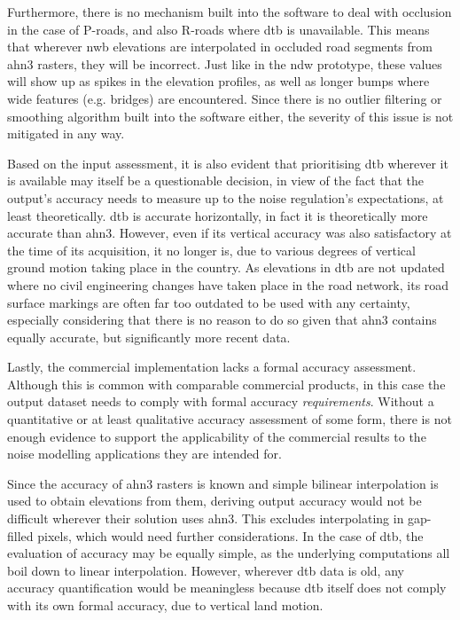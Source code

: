 Furthermore, there is no mechanism built into the software to deal with occlusion in the case of P-roads, and also R-roads where \ac{dtb} is unavailable. This means that wherever \ac{nwb} elevations are interpolated in occluded road segments from \ac{ahn3} rasters, they will be incorrect. Just like in the \ac{ndw} prototype, these values will show up as spikes in the elevation profiles, as well as longer bumps where wide features (e.g. bridges) are encountered. Since there is no outlier filtering or smoothing algorithm built into the software either, the severity of this issue is not mitigated in any way.

Based on the input assessment, it is also evident that prioritising \ac{dtb} wherever it is available may itself be a questionable decision, in view of the fact that the output's accuracy needs to measure up to the noise regulation's expectations, at least theoretically. \ac{dtb} is accurate horizontally, in fact it is theoretically more accurate than \ac{ahn3}. However, even if its vertical accuracy was also satisfactory at the time of its acquisition, it no longer is, due to various degrees of vertical ground motion taking place in the country. As elevations in \ac{dtb} are not updated where no civil engineering changes have taken place in the road network, its road surface markings are often far too outdated to be used with any certainty, especially considering that there is no reason to do so given that \ac{ahn3} contains equally accurate, but significantly more recent data.

Lastly, the commercial implementation lacks a formal accuracy assessment. Although this is common with comparable commercial products, in this case the output dataset needs to comply with formal accuracy \textit{requirements}. Without a quantitative or at least qualitative accuracy assessment of some form, there is not enough evidence to support the applicability of the commercial results to the noise modelling applications they are intended for.

Since the accuracy of \ac{ahn3} rasters is known and simple bilinear interpolation is used to obtain elevations from them, deriving output accuracy would not be difficult wherever their solution uses \ac{ahn3}. This excludes interpolating in gap-filled pixels, which would need further considerations. In the case of \ac{dtb}, the evaluation of accuracy may be equally simple, as the underlying computations all boil down to linear interpolation. However, wherever \ac{dtb} data is old, any accuracy quantification would be meaningless because \ac{dtb} itself does not comply with its own formal accuracy, due to vertical land motion.
